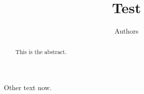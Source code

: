 \documentclass{article}
\title{Test}
\author{Authors}
\date{}
\begin{document}
\maketitle

\begin{abstract}
  This is the abstract.
  
\end{abstract}

Other text now.
\end{document}
